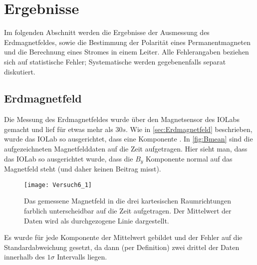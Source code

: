 \section{Ergebnisse}
\label{sec:ergebnisse}
Im folgenden Abschnitt werden die Ergebnisse der Ausmessung des Erdmagnetfeldes, sowie die Bestimmung der Polarität eines Permanentmagneten und die Berechnung eines Stromes in einem Leiter. Alle Fehlerangaben beziehen sich auf statistische Fehler; Systematische werden gegebenenfalls separat diskutiert.

\subsection{Erdmagnetfeld}
Die Messung des Erdmagnetfeldes wurde über den Magnetsensor des IOLabs gemacht und lief für etwas mehr als \( 30 \unit{s} \). Wie in \autoref{sec:Erdmagnetfeld} beschrieben, wurde das IOLab so ausgerichtet, dass eine Komponente .
In \autoref{fig:Bmean} sind die aufgezeichneten Magnetfelddaten auf die Zeit aufgetragen. Hier sieht man, dass das IOLab so ausgerichtet wurde, dass die \( B_y \) Komponente normal auf das Magnetfeld steht (und daher keinen Beitrag misst). 

\begin{figure}[H]	
	\centering
	\texttt{[image: Versuch6\_1]}
	\caption{Das gemessene Magnetfeld in die drei kartesischen Raumrichtungen farblich unterscheidbar auf die Zeit aufgetragen. Der Mittelwert der Daten wird als durchgezogene Linie dargestellt.}
	\label{fig:Bmean}
\end{figure}

Es wurde für jede Komponente der Mittelwert gebildet und der Fehler auf die Standardabweichung gesetzt, da dann (per Definition) zwei drittel der Daten innerhalb des \( 1\sigma \) Intervalls liegen. 

